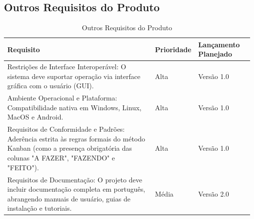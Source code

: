 \subsection{Outros Requisitos do Produto}
\begin{table}[H]
    \centering
    \begin{tabular}{|p{6cm}|p{2cm}|p{6cm}|}
        \hline
        \textbf{Requisito} & \textbf{Prioridade} & \textbf{Lançamento Planejado} \\ \hline
        Restrições de Interface Interoperável: O sistema deve suportar operação via interface gráfica com o usuário (GUI). & Alta & Versão 1.0 \\ \hline
        Ambiente Operacional e Plataforma: Compatibilidade nativa em Windows, Linux, MacOS e Android. & Alta & Versão 1.0 \\ \hline
        Requisitos de Conformidade e Padrões: Aderência estrita às regras formais do método Kanban (como a presença obrigatória das colunas "A FAZER", "FAZENDO" e "FEITO"). & Alta & Versão 1.0 \\ \hline
        Requisitos de Documentação: O projeto deve incluir documentação completa em português, abrangendo manuais de usuário, guias de instalação e tutoriais. & Média & Versão 2.0 \\ \hline
    \end{tabular}
    \caption{Outros Requisitos do Produto}
\end{table}
